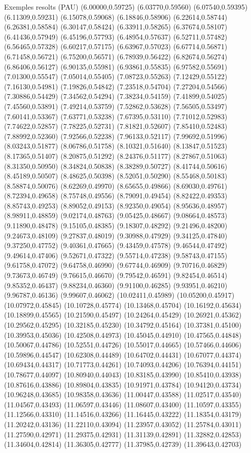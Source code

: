 \documentclass[11pt,a4paper]{article}
\begin{document}
\begin{fmex}{Exemples resolts (PAU)}
(6.00000,0.59725) (6.03770,0.59560) (6.07540,0.59395) (6.11309,0.59231) (6.15078,0.59068) (6.18846,0.58906) (6.22614,0.58744) (6.26381,0.58584) (6.30147,0.58424) (6.33911,0.58265) (6.37674,0.58107) (6.41436,0.57949) (6.45196,0.57793) (6.48954,0.57637) (6.52711,0.57482) (6.56465,0.57328) (6.60217,0.57175) (6.63967,0.57023) (6.67714,0.56871) (6.71458,0.56721) (6.75200,0.56571) (6.78939,0.56422) (6.82674,0.56274) (6.86406,0.56127) (6.90135,0.55981) (6.93861,0.55835) (6.97582,0.55691) (7.01300,0.55547) (7.05014,0.55405) (7.08723,0.55263) (7.12429,0.55122) (7.16130,0.54981) (7.19826,0.54842) (7.23518,0.54704) (7.27204,0.54566) (7.30886,0.54429) (7.34562,0.54294) (7.38234,0.54159) (7.41899,0.54025) (7.45560,0.53891) (7.49214,0.53759) (7.52862,0.53628) (7.56505,0.53497) (7.60141,0.53367) (7.63771,0.53238) (7.67395,0.53110) (7.71012,0.52983) (7.74622,0.52857) (7.78225,0.52731) (7.81821,0.52607) (7.85410,0.52483) (7.88992,0.52360) (7.92566,0.52238) (7.96133,0.52117) (7.99692,0.51996) (8.03243,0.51877) (8.06786,0.51758) (8.10321,0.51640) (8.13847,0.51523) (8.17365,0.51407) (8.20875,0.51292) (8.24376,0.51177) (8.27867,0.51063) (8.31350,0.50950) (8.34824,0.50838) (8.38289,0.50727) (8.41744,0.50616) (8.45189,0.50507) (8.48625,0.50398) (8.52051,0.50290) (8.55468,0.50183) (8.58874,0.50076) (8.62269,0.49970) (8.65655,0.49866) (8.69030,0.49761) (8.72394,0.49658) (8.75748,0.49556) (8.79091,0.49454) (8.82422,0.49353) (8.85743,0.49253) (8.89052,0.49153) (8.92350,0.49054) (8.95636,0.48957) (8.98911,0.48859) (9.02174,0.48763) (9.05425,0.48667) (9.08664,0.48573) (9.11890,0.48478) (9.15105,0.48385) (9.18307,0.48292) (9.21496,0.48200) (9.24673,0.48109) (9.27837,0.48019) (9.30988,0.47929) (9.34125,0.47840) (9.37250,0.47752) (9.40361,0.47665) (9.43459,0.47578) (9.46544,0.47492) (9.49614,0.47406) (9.52671,0.47322) (9.55714,0.47238) (9.58743,0.47155) (9.61758,0.47072) (9.64758,0.46990) (9.67744,0.46909) (9.70716,0.46829) (9.73673,0.46749) (9.76615,0.46670) (9.79542,0.46591) (9.82454,0.46514) (9.85352,0.46437) (9.88234,0.46360) (9.91100,0.46285) (9.93951,0.46210) (9.96787,0.46136) (9.99607,0.46062) (10.02411,0.45989) (10.05200,0.45917) (10.07972,0.45845) (10.10728,0.45774) (10.13468,0.45704) (10.16192,0.45634) (10.18899,0.45565) (10.21590,0.45497) (10.24264,0.45429) (10.26921,0.45362) (10.29562,0.45295) (10.32185,0.45230) (10.34792,0.45164) (10.37381,0.45100) (10.39953,0.45036) (10.42508,0.44973) (10.45045,0.44910) (10.47565,0.44848) (10.50067,0.44786) (10.52551,0.44726) (10.55017,0.44665) (10.57466,0.44606) (10.59896,0.44547) (10.62308,0.44489) (10.64702,0.44431) (10.67077,0.44374) (10.69434,0.44317) (10.71773,0.44261) (10.74093,0.44206) (10.76394,0.44151) (10.78677,0.44097) (10.80940,0.44043) (10.83185,0.43990) (10.85410,0.43938) (10.87616,0.43886) (10.89804,0.43835) (10.91971,0.43784) (10.94120,0.43734) (10.96248,0.43685) (10.98358,0.43636) (11.00447,0.43588) (11.02517,0.43540) (11.04567,0.43493) (11.06597,0.43446) (11.08607,0.43400) (11.10597,0.43355) (11.12566,0.43310) (11.14516,0.43266) (11.16445,0.43222) (11.18354,0.43179) (11.20242,0.43136) (11.22110,0.43094) (11.23957,0.43052) (11.25784,0.43011) (11.27590,0.42971) (11.29375,0.42931) (11.31139,0.42891) (11.32882,0.42853) (11.34604,0.42814) (11.36305,0.42777) (11.37985,0.42739) (11.39643,0.42703) 
\end{fmex}
\end{document}
